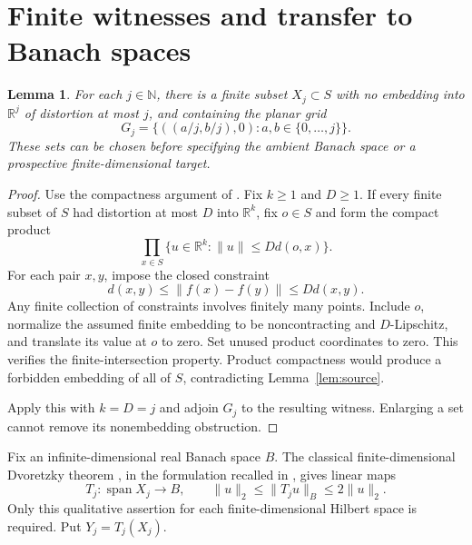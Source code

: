 \documentclass[11pt]{article}
\newtheorem{lemma}[theorem]{Lemma}
\theoremstyle{remark}
\newcommand{\R}{\mathbb R}
\newcommand{\N}{\mathbb N}
\newcommand{\norm}[1]{\lVert#1\rVert}
\DeclareMathOperator{\spanop}{span}
\begin{document}
\section{Finite witnesses and transfer to Banach spaces}\label{sec:witnesses}
\begin{lemma}\label{lem:witnesses}
For each $j\in\N$, there is a finite subset $X_j\subset S$ with no embedding into $\R^j$ of distortion at most $j$, and containing the planar grid
\begin{equation}\label{eq:grid}
 G_j=\{((a/j,b/j),0):a,b\in\{0,\ldots,j\}\}.
\end{equation}
These sets can be chosen before specifying the ambient Banach space or a prospective finite-dimensional target.
\end{lemma}
\begin{proof}
Use the compactness argument of \cite[Section 7]{OpenAI}. Fix $k\ge1$ and $D\ge1$. If every finite subset of $S$ had distortion at most $D$ into $\R^k$, fix $o\in S$ and form the compact product
\[
 \prod_{x\in S}\{u\in\R^k:\norm u\le Dd(o,x)\}.
\]
For each pair $x,y$, impose the closed constraint
\[
 d(x,y)\le\norm{f(x)-f(y)}\le Dd(x,y).
\]
Any finite collection of constraints involves finitely many points. Include $o$, normalize the assumed finite embedding to be noncontracting and $D$-Lipschitz, and translate its value at $o$ to zero. Set unused product coordinates to zero. This verifies the finite-intersection property. Product compactness would produce a forbidden embedding of all of $S$, contradicting Lemma~\ref{lem:source}.

Apply this with $k=D=j$ and adjoin $G_j$ to the resulting witness. Enlarging a set cannot remove its nonembedding obstruction.
\end{proof}

Fix an infinite-dimensional real Banach space $B$. The classical finite-dimensional Dvoretzky theorem \cite{Dvoretzky}, in the formulation recalled in \cite[Theorem 1.1]{COO}, gives linear maps
\[
 T_j:\spanop X_j\longrightarrow B,
 \qquad \norm u_2\le\norm{T_ju}_B\le2\norm u_2.
\]
Only this qualitative assertion for each finite-dimensional Hilbert space is required. Put $Y_j=T_j(X_j)$.
\end{document}
